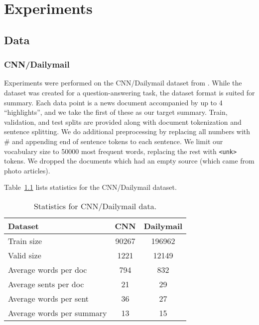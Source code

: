 \documentclass[11pt]{report}
\begin{document}
\chapter{Experiments}

\section{Data}

\subsection{CNN/Dailymail}

Experiments were performed on the CNN/Dailymail dataset from \cite{hermann2015read}. While the dataset was created for a question-answering task, the dataset format is suited for summary. Each data point is a news document accompanied by up to 4 ``highlights'', and we take the first of these as our target summary. Train, validation, and test splits are provided along with document tokenization and sentence splitting. We do additional preprocessing by replacing all numbers with \# and appending end of sentence tokens to each sentence. We limit our vocabulary size to 50000 most frequent words, replacing the rest with \texttt{<unk>} tokens. We dropped the documents which had an empty source (which came from photo articles).

 Table~\ref{data_stats} lists statistics for the CNN/Dailymail dataset.

\begin{table}[h]
\centering
\begin{tabular}{lcc}
\toprule
Dataset  & CNN & Dailymail \\
\midrule
Train size & 90267 & 196962 \\
Valid size & 1221 & 12149 \\
Average words per doc & 794 & 832\\
Average sents per doc & 21 & 29\\
Average words per sent & 36 & 27\\
Average words per summary & 13 & 15 \\
\bottomrule
\end{tabular}
\caption{Statistics for CNN/Dailymail data.}
\label{data_stats}
\end{table}



\end{document}
